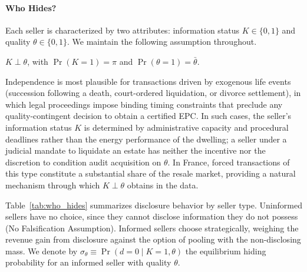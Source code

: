 \paragraph{Who Hides?}

Each seller is characterized by two attributes: information status $K \in \{0,1\}$ and quality $\theta \in \{0,1\}$. We maintain the following assumption throughout.

\begin{assumption}[Independence]\label{ass:independence}
$K \perp \theta$, with $\Pr(K=1) = \pi$ and $\Pr(\theta=1) = \bar{\theta}$.
\end{assumption}

\noindent Independence is most plausible for transactions driven by exogenous life events (succession following a death, court-ordered liquidation, or divorce settlement), in which legal proceedings impose binding timing constraints that preclude any quality-contingent decision to obtain a certified EPC. In such cases, the seller's information status $K$ is determined by administrative capacity and procedural deadlines rather than the energy performance of the dwelling; a seller under a judicial mandate to liquidate an estate has neither the incentive nor the discretion to condition audit acquisition on $\theta$. In France, forced transactions of this type constitute a substantial share of the resale market, providing a natural mechanism through which $K \perp \theta$ obtains in the data.

Table~\ref{tab:who_hides} summarizes disclosure behavior by seller type. Uninformed sellers have no choice, since they cannot disclose information they do not possess (No Falsification Assumption). Informed sellers choose strategically, weighing the revenue gain from disclosure against the option of pooling with the non-disclosing mass. We denote by $\sigma_\theta \equiv \Pr(d=0 \mid K=1, \theta)$ the equilibrium hiding probability for an informed seller with quality $\theta$.

